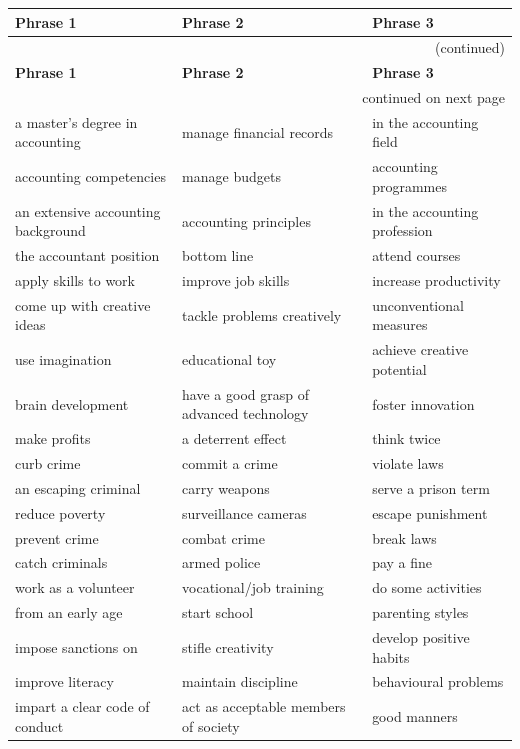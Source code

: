 \documentclass[10pt,a4paper]{article}
\begin{document}
\setlength{\tabcolsep}{8pt}
\renewcommand{\arraystretch}{1.3}
{\large
\begin{longtable}{@{}*{3}{p{}}@{}}
\toprule
\textbf{Phrase 1} & \textbf{Phrase 2} & \textbf{Phrase 3} \\ \midrule
\endfirsthead
\multicolumn{3}{r}{\footnotesize (continued)} \\
\toprule
\textbf{Phrase 1} & \textbf{Phrase 2} & \textbf{Phrase 3} \\ \midrule
\endhead
\midrule
\multicolumn{3}{r}{\footnotesize continued on next page} \\
\endfoot
\bottomrule
\endlastfoot
a master's degree in accounting & manage financial records & in the accounting field \\
accounting competencies & manage budgets & accounting programmes \\
an extensive accounting background & accounting principles & in the accounting profession \\
the accountant position & bottom line & attend courses \\
apply skills to work & improve job skills & increase productivity \\
come up with creative ideas & tackle problems creatively & unconventional measures \\
use imagination & educational toy & achieve creative potential \\
brain development & have a good grasp of advanced technology & foster innovation \\
make profits & a deterrent effect & think twice \\
curb crime & commit a crime & violate laws \\
an escaping criminal & carry weapons & serve a prison term \\
reduce poverty & surveillance cameras & escape punishment \\
prevent crime & combat crime & break laws \\
catch criminals & armed police & pay a fine \\
work as a volunteer & vocational/job training & do some activities \\
from an early age & start school & parenting styles \\
impose sanctions on & stifle creativity & develop positive habits \\
improve literacy & maintain discipline & behavioural problems \\
impart a clear code of conduct & act as acceptable members of society & good manners \\

\end{longtable}}
\end{document}
